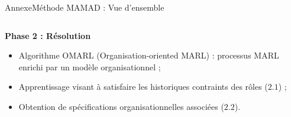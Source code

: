 \begin{frame}{Annexe}{Méthode MAMAD : Vue d’ensemble}

    \begin{columns}

        \begin{column}{0.6\textwidth}

            \textbf{Phase 2 : Résolution}

            \begin{itemize}
                \item Algorithme OMARL (Organisation-oriented MARL) : processus MARL enrichi par un modèle organisationnel ;
                \item Apprentissage visant à satisfaire les historiques contraints des rôles ($2.1$) ;
                \item Obtention de spécifications organisationnelles associées ($2.2$).
            \end{itemize}

        \end{column}

        \begin{column}{0.4\textwidth}
            \centering
        \end{column}


\end{columns}
\end{frame}
